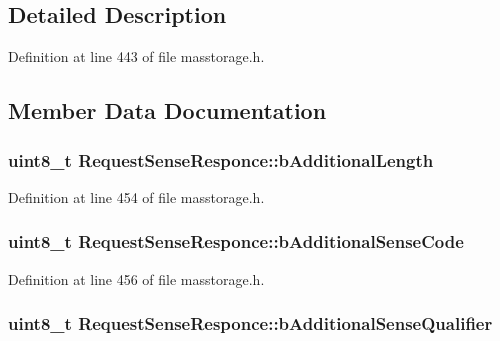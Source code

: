 \subsection{\-Detailed \-Description}


\-Definition at line 443 of file masstorage.\-h.



\subsection{\-Member \-Data \-Documentation}
\hypertarget{struct_request_sense_responce_adbc6f965fe2820222504d1e8853f1518}{
\subsubsection[{b\-Additional\-Length}]{\setlength{\rightskip}{0pt plus 5cm}uint8\-\_\-t {\bf \-Request\-Sense\-Responce\-::b\-Additional\-Length}}}\label{struct_request_sense_responce_adbc6f965fe2820222504d1e8853f1518}


\-Definition at line 454 of file masstorage.\-h.

\hypertarget{struct_request_sense_responce_a554063acfa94e465da27a7dc73cf786a}{
\subsubsection[{b\-Additional\-Sense\-Code}]{\setlength{\rightskip}{0pt plus 5cm}uint8\-\_\-t {\bf \-Request\-Sense\-Responce\-::b\-Additional\-Sense\-Code}}}\label{struct_request_sense_responce_a554063acfa94e465da27a7dc73cf786a}


\-Definition at line 456 of file masstorage.\-h.

\hypertarget{struct_request_sense_responce_a628379310065c48e738bd07037b329e6}{
\subsubsection[{b\-Additional\-Sense\-Qualifier}]{\setlength{\rightskip}{0pt plus 5cm}uint8\-\_\-t {\bf \-Request\-Sense\-Responce\-::b\-Additional\-Sense\-Qualifier}}}\label{struct_request_sense_responce_a628379310065c48e738bd07037b329e6}


